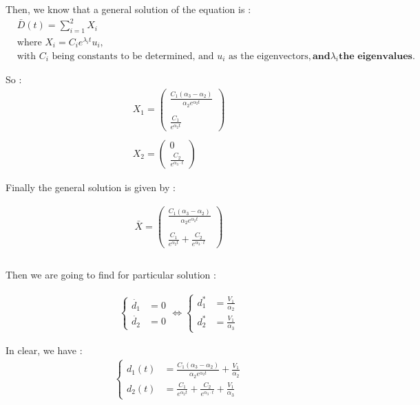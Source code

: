 \documentclass{article}
\begin{document}
	Then, we know that a general solution of the equation is : 
	\begin{align*}
		&\bar{D}
		(t) = \sum_{i=1}^2 X_i \\
		&\text{where } X_i = C_i e^{\lambda_it} u_i, \\
		&\text{with } C_i \text{ being constants to be determined, and } u_i \text{ as the eigenvectors}, \textbf{and} \lambda_i \textbf{the eigenvalues}.
	\end{align*}
	
	So : 
	\begin{align*}
		X_1=\begin{pmatrix}
			\frac{C_1(\alpha_3-\alpha_2)}{\alpha_2e^{\alpha_2t}} \\ \\
			\frac{C_1}{e^{\alpha_2t}}
		\end{pmatrix} \\ \\ 
		X_2=\begin{pmatrix}
			0 \\
			\frac{C_2}{e^{\alpha_3 \cdot t}}
		\end{pmatrix}
	\end{align*}
	
	Finally the general solution is given by : 
	
	\begin{align*}
		\bar{X}
		=\begin{pmatrix}
			\frac{C_1(\alpha_3-\alpha_2)}{\alpha_2e^{\alpha_2t}} \\ \\
			\frac{C_1}{e^{\alpha_2t}} + \frac{C_2}{e^{\alpha_3 \cdot t}}
		\end{pmatrix} \\ \\ 
	\end{align*}
	
	Then we are going to find for particular solution : 
	
	
	\begin{align*}
		\begin{cases}
			\dot{d_1} &= 0 \\
			\dot{d_2} &= 0
		\end{cases} \iff 
		\begin{cases}
			d_1^* &= \frac{V_1}{\alpha_2} \\
			d_2^* &= \frac{V_1}{\alpha_3}
		\end{cases}
	\end{align*}
	
	In clear, we have : 
	\begin{align*}
		\begin{cases}
			d_1(t) &= \frac{C_1(\alpha_3-\alpha_2)}{\alpha_2e^{\alpha_2t}}+ \frac{V_1}{\alpha_2}\\
			d_2(t) &= \frac{C_1}{e^{\alpha_2t}} + \frac{C_2}{e^{\alpha_3 \cdot t}} + \frac{V_1}{\alpha_3}
		\end{cases}
	\end{align*}
	
\end{document}

